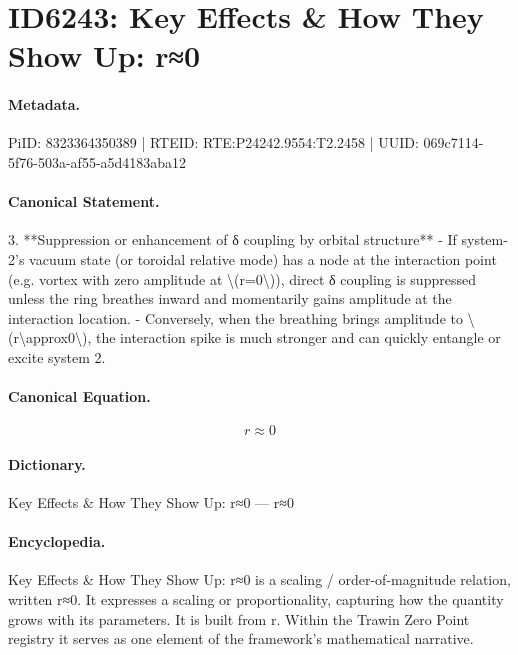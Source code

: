 \section*{ID6243: Key Effects \& How They Show Up: r≈0}
\paragraph{Metadata.}
PiID: 8323364350389 | RTEID: RTE:P24242.9554:T2.2458 | UUID: 069c7114-5f76-503a-af55-a5d4183aba12

\paragraph{Canonical Statement.}
3. **Suppression or enhancement of δ coupling by orbital structure** - If system-2’s vacuum state (or toroidal relative mode) has a node at the interaction point (e.g. vortex with zero amplitude at \textbackslash{}(r=0\textbackslash{})), direct δ coupling is suppressed unless the ring breathes inward and momentarily gains amplitude at the interaction location. - Conversely, when the breathing brings amplitude to \textbackslash{}(r\textbackslash{}approx0\textbackslash{}), the interaction spike is much stronger and can quickly entangle or excite system 2.

\paragraph{Canonical Equation.}
\[
r\approx0
\]

\paragraph{Dictionary.}
Key Effects \& How They Show Up: r≈0 — r≈0

\paragraph{Encyclopedia.}
Key Effects \& How They Show Up: r≈0 is a scaling / order-of-magnitude relation, written r≈0. It expresses a scaling or proportionality, capturing how the quantity grows with its parameters. It is built from r. Within the Trawin Zero Point registry it serves as one element of the framework's mathematical narrative.
